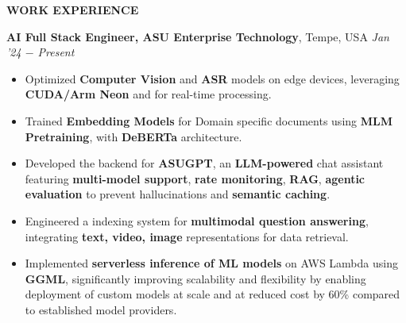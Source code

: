 \documentclass[10pt,a4]{article}
\def\hrulefill{\leavevmode\leaders\hrule height 1pt\hfill\kern0pt}		%
\begin{document}
{    %
		
\begin{flushleft}
    {\Large \textbf{WORK EXPERIENCE}} %

    \vspace{1.5mm}
    \hspace{1.5mm} \textbf{\large AI Full Stack Engineer, ASU Enterprise Technology},   Tempe, USA \hfill \textit{\large Jan '24 $-$ Present}	\\
    \begin{itemize}
        \item Optimized \textbf{Computer Vision} and \textbf{ASR} models on edge devices, leveraging \textbf{CUDA/Arm Neon} and for real-time processing.
        \item Trained \textbf{Embedding Models} for Domain specific documents using \textbf{MLM Pretraining}, with  \textbf{DeBERTa} architecture.
        \item Developed the backend for \textbf{ASUGPT}, an \textbf{LLM-powered} chat assistant featuring \textbf{multi-model support}, \textbf{rate monitoring}, \textbf{RAG}, \textbf{agentic evaluation} to prevent hallucinations and \textbf{semantic caching}.

        \item Engineered a indexing system for \textbf{multimodal question answering}, integrating \textbf{text, video, image} representations for data retrieval.
        \item Implemented \textbf{serverless inference of ML models} on AWS Lambda using \textbf{GGML}, significantly improving scalability and flexibility by enabling deployment of custom models at scale and at reduced cost by 60\% compared to established model providers.


    \end{itemize}	
    

\end{flushleft}}
\end{document}
